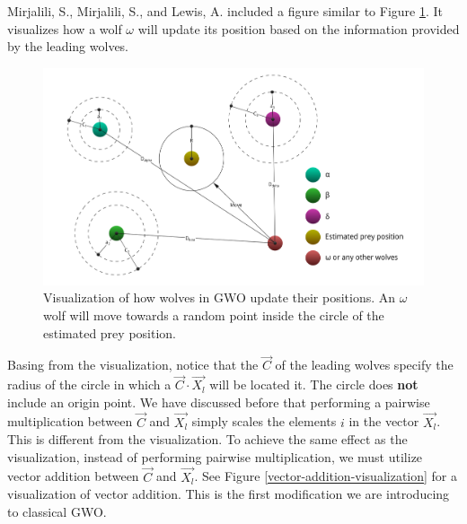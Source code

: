 Mirjalili, S., Mirjalili, S., and Lewis, A. \cite{Mirjalili2014} included a figure similar to Figure \ref{gwo-positioning-update}. It visualizes how a wolf $\omega$ will update its position based on the information provided by the leading wolves.

\begin{figure}[h!]
	\centering
	\includegraphics[scale=0.3]{./images/chap05-methodology/gwo-position-updating.png}
	\caption{Visualization of how wolves in GWO update their positions. An $\omega$ wolf will move towards a random point inside the circle of the estimated prey position.}
	\label{gwo-positioning-update}
\end{figure}

Basing from the visualization, notice that the $\vec{C}$ of the leading wolves specify the radius of the circle in which a $\vec{C} \cdot \vec{X_{l}}$ will be located it. The circle does \textbf{not} include an origin point. We have discussed before that performing a pairwise multiplication between $\vec{C}$ and $\vec{X_{l}}$ simply scales the elements $i$ in the vector $\vec{X_{l}}$. This is different from the visualization. To achieve the same effect as the visualization, instead of performing pairwise multiplication, we must utilize vector addition between $\vec{C}$ and $\vec{X_{l}}$. See Figure \ref{vector-addition-visualization} for a visualization of vector addition. This is the first modification we are introducing to classical GWO.

